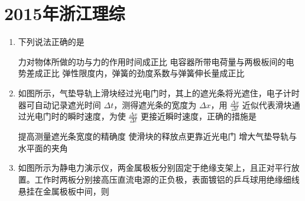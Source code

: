 \documentclass[\gkver]{gaokaozhenti}
\begin{document}
\chapter{2015年浙江理综}

\begin{enumerate}
\item
下列说法正确的是

{力对物体所做的功与力的作用时间成正比}
{电容器所带电荷量与两极板间的电势差成正比}
{弹性限度内，弹簧的劲度系数与弹簧伸长量成正比}


\item
如图所示，气垫导轨上滑块经过光电门时，其上的遮光条将光遮住，电子计时器可自动记录遮光时间 $\Delta t$，测得遮光条的宽度为 $\Delta x$，用 $\frac{\Delta x}{\Delta t}$ 近似代表滑块通过光电门时的瞬时速度，为使 $\frac{\Delta x}{\Delta t}$ 更接近瞬时速度，正确的措施是


{提高测量遮光条宽度的精确度}
{使滑块的释放点更靠近光电门}
{增大气垫导轨与水平面的夹角}


\item
如图所示为静电力演示仪，两金属极板分别固定于绝缘支架上，且正对平行放置。工作时两板分别接高压直流电源的正负极，表面镀铝的乒乓球用绝缘细线悬挂在金属极板中间，则


\end{enumerate}
\end{document}
